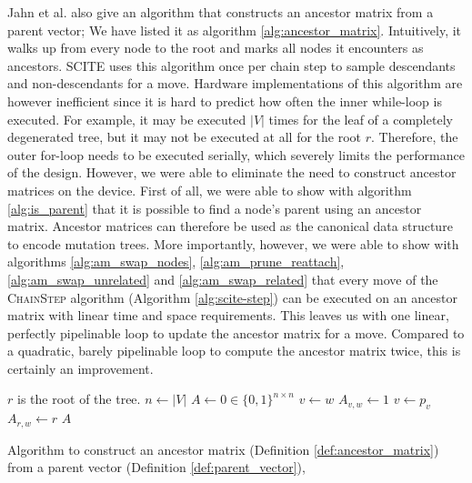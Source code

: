 Jahn et al. \cite{tree2016} also give an algorithm that constructs an ancestor matrix from a parent vector; We have listed it as algorithm \ref{alg:ancestor_matrix}. Intuitively, it walks up from every node to the root and marks all nodes it encounters as ancestors. \ac{SCITE} uses this algorithm once per chain step to sample descendants and non-descendants for a move. Hardware implementations of this algorithm are however inefficient since it is hard to predict how often the inner while-loop is executed. For example, it may be executed $|V|$ times for the leaf of a completely degenerated tree, but it may not be executed at all for the root $r$. Therefore, the outer for-loop needs to be executed serially, which severely limits the performance of the design. However, we were able to eliminate the need to construct ancestor matrices on the device. First of all, we were able to show with algorithm \ref{alg:is_parent} that it is possible to find a node's parent using an ancestor matrix. Ancestor matrices can therefore be used as the canonical data structure to encode mutation trees. More importantly, however, we were able to show with algorithms \ref{alg:am_swap_nodes}, \ref{alg:am_prune_reattach}, \ref{alg:am_swap_unrelated} and \ref{alg:am_swap_related} that every move of the \textsc{ChainStep} algorithm (Algorithm \ref{alg:scite-step}) can be executed on an ancestor matrix with linear time and space requirements. This leaves us with one linear, perfectly pipelinable loop to update the ancestor matrix for a move. Compared to a quadratic, barely pipelinable loop to compute the ancestor matrix twice, this is certainly an improvement.

\begin{algorithm}
    \begin{algorithmic}[1]
         \Comment $r$ is the root of the tree.
            \State $n \leftarrow |V|$
            \State $A \leftarrow 0 \in \{0,1\}^{n \times n}$
                \State $v \leftarrow w$
                    \State $A_{v, w} \leftarrow 1$
                    \State $v \leftarrow p_v$
                \EndWhile
                \State $A_{r, w} \leftarrow r$
            \EndFor
            \State \Return $A$
        \EndFunction
    \end{algorithmic}
    \caption{Algorithm to construct an ancestor matrix (Definition \ref{def:ancestor_matrix}) from a parent vector (Definition \ref{def:parent_vector}), \cite{tree2016}}
    \label{alg:ancestor_matrix}
\end{algorithm}

